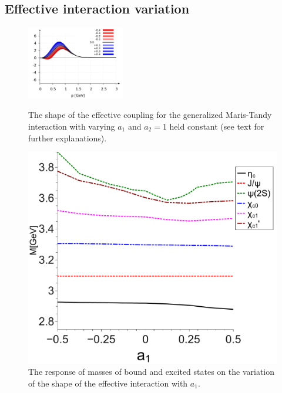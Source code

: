\subsection*{Effective interaction variation}\label{int1}
%
\begin{figure}[!t]
  \begin{center}
    \includegraphics[width=0.38\textwidth]{figures/maris_a1}
    \caption{The shape of the effective coupling for the generalized Maris-Tandy interaction 
             with varying $a_1$ and $a_2=1$ held constant (see text for further explanations).}
    \label{fig:slope_a1}
  \end{center}
  \begin{center}
    \includegraphics[scale=0.25]{figures/trend_a1_CC}
    \caption{The response of masses of bound and excited states on the variation of the shape 
             of the effective interaction with $a_1$.}
    \label{fig:trend_a1}
  \end{center}
\end{figure}
%
